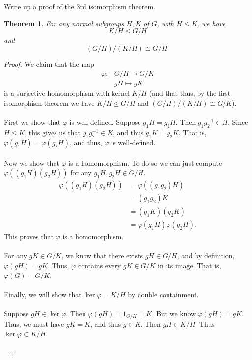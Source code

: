 \documentclass[12 pt, letterpaper]{hmcpset}
\newtheorem*{theorem}{Theorem}
\begin{document}
\begin{problem}[3.]
	Write up a proof of the 3rd isomorphism theorem.
\end{problem}
	\begin{theorem}
		For any normal subgroups $H, K$ of $G$, with $H \le K$, we have
		\[
			K/H \trianglelefteq G/H
		\]
		and
		\[
			(G/H)/(K/H) \cong G/H. 
		\]
	\end{theorem}
	\begin{proof}
		We claim that the map
		\[
			\begin{split}
				\varphi \colon & G/H \to G/K \\
					       & gH \mapsto gK
			\end{split}
		\]
		is a surjective homomorphism with kernel $K/H$ (and that thus, by the first isomorphism theorem we have $K/H \trianglelefteq G/H$ and $(G/H)/(K/H) \cong G/K$). \\\\
		First we show that $\varphi$ is well-defined. Suppose $g_{1} H = g_{2} H$. Then $g_{1} g_{2}^{-1} \in H$. Since $H \le K$, this gives us that $g_{1} g_{2}^{-1} \in K$, and thus $g_{1} K = g_{2} K$. That is, $\varphi(g_{1} H) = \varphi(g_{2} H)$, and thus, $\varphi$ is well-defined. \\\\
		Now we show that $\varphi$ is a homomorphism. To do so we can just compute $\varphi((g_{1}H)(g_{2} H))$ for any $g_{1}H, g_{2}H \in G/H$.
		\[
			\begin{split}
				\varphi((g_{1}H)(g_{2}H)) & = \varphi((g_{1}g_{2})H) \\
							  & = (g_1 g_{2}) K \\
							  & = (g_{1} K) (g_{2} K) \\
							  & = \varphi(g_{1} H) \varphi(g_{2} H).
			\end{split}
		\]
		This proves that $\varphi$ is a homomorphism. \\\\
		For any $gK \in G/K$, we know that there exists $gH \in G/H$, and by definition, $\varphi(gH) = gK$. Thus, $\varphi$ contains every $gK \in G/K$ in its image. That is, $\varphi(G) = G/K$. \\\\
		Finally, we will show that $\ker \varphi = K/H$ by double containment. \\\\
		Suppose $gH \in \ker \varphi$. Then $\varphi(gH) = 1_{G/K} = K$. But we know $\varphi(gH) = gK$. Thus, we must have $gK = K$, and thus $g \in K$. Then $gH \in K/H$. Thus $\ker \varphi \subset K/H$.  \\\\

\end{proof}
\end{document}
